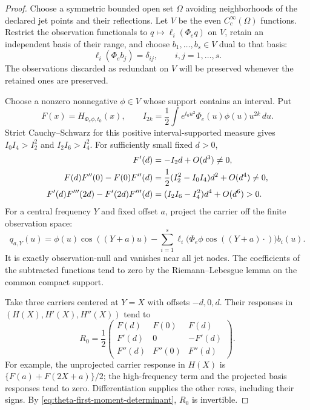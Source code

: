 \documentclass[11pt]{article}
\numberwithin{equation}{section}
\theoremstyle{definition}
\theoremstyle{remark}
\begin{document}
\begin{proof}
Choose a symmetric bounded open set $\Omega$ avoiding neighborhoods of
the declared jet points and their reflections.  Let $V$ be the even
$C_c^\infty(\Omega)$ functions.  Restrict the observation functionals
to $q\mapsto\ell_i(\Phi_eq)$ on $V$, retain an independent basis of
their range, and choose $b_1,\ldots,b_s\in V$ dual to that basis:
\[
 \ell_i(\Phi_eb_j)=\delta_{ij},\qquad i,j=1,\ldots,s.
\]
The observations discarded as redundant on $V$ will be preserved
whenever the retained ones are preserved.

Choose a nonzero nonnegative $\phi\in V$ whose support contains an
interval.  Put
\[
 F(x)=H_{\Phi_e\phi,t_0}(x),\qquad
 I_{2k}=\frac12\int e^{t_0u^2}\Phi_e(u)\phi(u)u^{2k}\,du.
\]
Strict Cauchy--Schwarz for this positive interval-supported measure
gives $I_0I_4>I_2^2$ and $I_2I_6>I_4^2$.  For sufficiently small
fixed $d>0$,
\begin{align}
 F'(d)&=-I_2d+O(d^3)\ne0,\notag\\
 F(d)F''(0)-F(0)F''(d)
     &=\frac12(I_2^2-I_0I_4)d^2+O(d^4)\ne0,
 \label{eq:theta-first-moment-determinant}\\
 F'(d)F'''(2d)-F'(2d)F'''(d)
     &=(I_2I_6-I_4^2)d^4+O(d^6)>0.
 \label{eq:theta-second-moment-determinant}
\end{align}
For a central frequency $Y$ and fixed offset $a$, project the carrier
off the finite observation space:
\begin{equation}
 q_{a,Y}(u)=\phi(u)\cos((Y+a)u)
 -\sum_{i=1}^s
       \ell_i\bigl(\Phi_e\phi\cos((Y+a)\cdot)\bigr)b_i(u).
 \label{eq:theta-projected-carrier}
\end{equation}
It is exactly observation-null and vanishes near all jet nodes.  The
coefficients of the subtracted functions tend to zero by the
Riemann--Lebesgue lemma on the common compact support.

Take three carriers centered at $Y=X$ with offsets $-d,0,d$.  Their
responses in $(H(X),H'(X),H''(X))$ tend to
\begin{equation}
 R_0=\frac12
 \begin{pmatrix}
 F(d)&F(0)&F(d)\\
 F'(d)&0&-F'(d)\\
 F''(d)&F''(0)&F''(d)
 \end{pmatrix}.
 \label{eq:theta-three-carrier-j0}
\end{equation}
For example, the unprojected carrier response in $H(X)$ is
$\{F(a)+F(2X+a)\}/2$; the high-frequency term and the projected basis
responses tend to zero.  Differentiation supplies the other rows,
including their signs.  By
\eqref{eq:theta-first-moment-determinant}, $R_0$ is invertible.


\end{proof}
\end{document}
